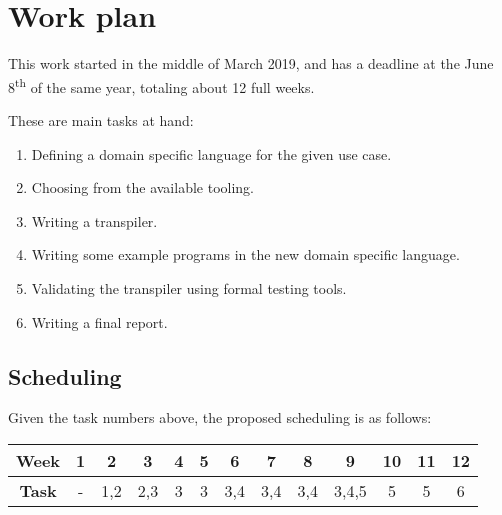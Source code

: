 \documentclass[runningheads]{llncs}
\begin{document}
\section{Work plan}
This work started in the middle of March 2019, and has a deadline at the June 8\textsuperscript{th} of the same year, totaling about 12 full weeks.
\par These are main tasks at hand:
\begin{enumerate}
	\item Defining a domain specific language for the given use case.
	\item Choosing from the available tooling.
	\item Writing a transpiler.
	\item Writing some example programs in the new domain specific language.
	\item Validating the transpiler using formal testing tools.
	\item Writing a final report.
\end{enumerate}
\subsection{Scheduling}
Given the task numbers above, the proposed scheduling is as follows:
\begin{table}
\centering
\begin{tabular}{c|c|c|c|c|c|c|c|c|c|c|c|c}
\hline
\textbf{Week} & 1 & 2   & 3   & 4 & 5 & 6   & 7   & 8   & 9     & 10 & 11 & 12 \\ \hline
\textbf{Task} & - & 1,2 & 2,3 & 3 & 3 & 3,4 & 3,4 & 3,4 & 3,4,5 & 5  & 5  & 6  \\ \hline
\end{tabular}
\end{table}



\end{document}
